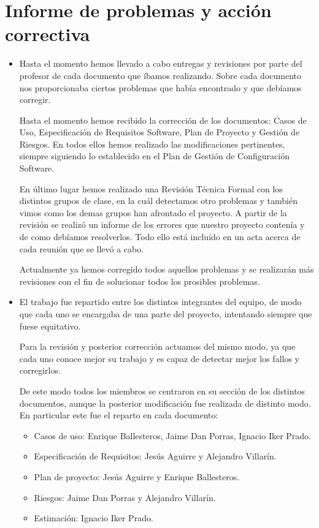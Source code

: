 \documentclass[spanish,a4paper,11pt, twoside]{report}	%
\begin{document}
\chapter{ \hspace{0.25cm}Informe de problemas y acción correctiva}
	\begin{itemize} 
		\item Hasta el momento hemos llevado a cabo entregas y revisiones por parte del profesor de cada documento que íbamos realizando. Sobre cada documento nos proporcionaba ciertos problemas que había encontrado y que debíamos corregir. 

	Hasta el momento hemos recibido la corrección de los documentos: Casos de Uso, Especificación de Requisitos Software, Plan de Proyecto y Gestión de Riesgos. En todos ellos hemos realizado las modificaciones pertinentes, siempre siguiendo lo establecido en el Plan de Gestión de Configuración Software. 

	En último lugar hemos realizado una Revisión Técnica Formal con los distintos grupos de clase, en la cuál detectamos otro problemas y también vimos como los demas grupos han afrontado el proyecto. A partir de la revisión se realizó un informe de los errores que nuestro proyecto contenía y de como debíamos resolverlos. Todo ello está incluido en un acta acerca de cada reunión que se llevó a cabo. 

	Actualmente ya hemos corregido todos aquellos problemas y se realizarán más revisiones con el fin de solucionar todos los prosibles problemas.

		\item El trabajo fue repartido entre los distintos integrantes del equipo, de modo que cada uno se encargaba de una parte del proyecto, intentando siempre que fuese equitativo. 

	Para la revisión y posterior corrección actuamos del mismo modo, ya que cada uno conoce mejor su trabajo y es capaz de detectar mejor los fallos y corregirlos. 

	De este modo todos los miembros se centraron en su sección de los distintos documentos, aunque la posterior modificación fue realizada de distinto modo. En particular este fue el reparto en cada documento:
		\begin{itemize}
			\item Casos de uso: Enrique Ballesteros, Jaime Dan Porras, Ignacio Iker Prado.
			\item Especificación de Requisitos: Jesús Aguirre y Alejandro Villarín.
			\item Plan de proyecto:  Jesús Aguirre y Enrique Ballesteros.
			\item Riesgos: Jaime Dan Porras y Alejandro Villarín.
			\item Estimación: Ignacio Iker Prado.
		\end{itemize}
	\end{itemize}
\end{document}

